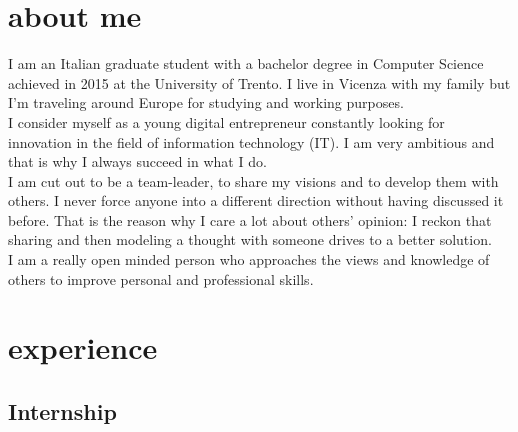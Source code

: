 \documentclass[]{friggeri-cv} %
\begin{document}
\section{about me}
{I am an Italian graduate student with a bachelor degree in Computer Science achieved in 2015 at the University of Trento. I live in Vicenza with my family but I’m traveling around Europe for studying and working purposes.
\\
I consider myself as a young digital entrepreneur constantly looking for innovation in the field of information technology (IT). I am very ambitious and that is why I always succeed in what I do.
\\
I am cut out to be a team-leader, to share my visions and to develop them with others.
I never force anyone into a different direction without having discussed it before. That is the reason why I care a lot about others’ opinion: I reckon that sharing and then modeling a thought with someone drives to a better solution. 
\\
I am a really open minded person who approaches the views and knowledge of others to improve personal and professional skills.
}


\section{experience}

\subsection{Internship}
\end{document}
